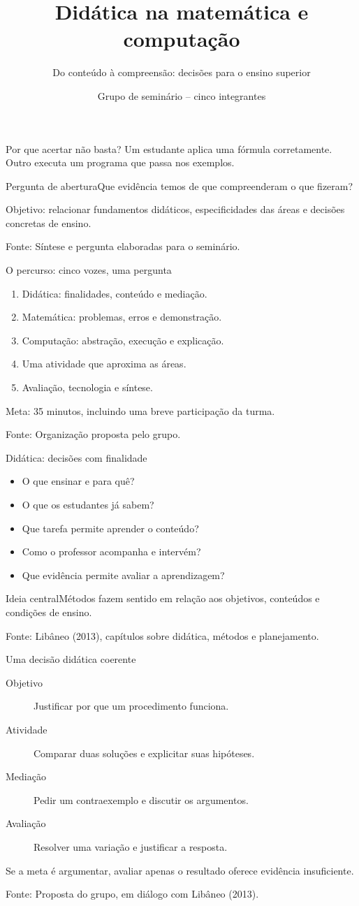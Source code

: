 \documentclass[aspectratio=169,11pt]{beamer}
\title{Didática na matemática e computação}
\subtitle{Do conteúdo à compreensão: decisões para o ensino superior}
\author{Grupo de seminário -- cinco integrantes}
\institute{SMA 5839 -- Preparação Pedagógica}
\date{}
\newcommand{\fonte}[1]{\par\vfill{\tiny\color{gray}Fonte: #1}}
\begin{document}
\begin{frame}{Por que acertar não basta?}
Um estudante aplica uma fórmula corretamente. Outro executa um programa que passa nos exemplos.\par\medskip
\begin{alertblock}{Pergunta de abertura}Que evidência temos de que compreenderam o que fizeram?\end{alertblock}
\medskip Objetivo: relacionar fundamentos didáticos, especificidades das áreas e decisões concretas de ensino.
\fonte{Síntese e pergunta elaboradas para o seminário.}
\end{frame}
\begin{frame}{O percurso: cinco vozes, uma pergunta}
\begin{enumerate}\item Didática: finalidades, conteúdo e mediação.\item Matemática: problemas, erros e demonstração.\item Computação: abstração, execução e explicação.\item Uma atividade que aproxima as áreas.\item Avaliação, tecnologia e síntese.\end{enumerate}\medskip Meta: 35 minutos, incluindo uma breve participação da turma.
\fonte{Organização proposta pelo grupo.}
\end{frame}
\begin{frame}{Didática: decisões com finalidade}
\begin{itemize}\item O que ensinar e para quê?\item O que os estudantes já sabem?\item Que tarefa permite aprender o conteúdo?\item Como o professor acompanha e intervém?\item Que evidência permite avaliar a aprendizagem?\end{itemize}\begin{block}{Ideia central}Métodos fazem sentido em relação aos objetivos, conteúdos e condições de ensino.\end{block}
\fonte{Libâneo (2013), capítulos sobre didática, métodos e planejamento.}
\end{frame}
\begin{frame}{Uma decisão didática coerente}
\begin{description}\item[Objetivo] Justificar por que um procedimento funciona.\item[Atividade] Comparar duas soluções e explicitar suas hipóteses.\item[Mediação] Pedir um contraexemplo e discutir os argumentos.\item[Avaliação] Resolver uma variação e justificar a resposta.\end{description}\medskip Se a meta é argumentar, avaliar apenas o resultado oferece evidência insuficiente.
\fonte{Proposta do grupo, em diálogo com Libâneo (2013).}
\end{frame}
\end{document}
